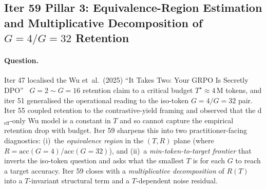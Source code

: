 \subsection{Iter 59 Pillar 3: Equivalence-Region Estimation and Multiplicative Decomposition of $G{=}4/G{=}32$ Retention}
\label{sec:group-size-iter59}

\paragraph{Question.}
Iter 47 localised the Wu et~al.\ (2025) ``It Takes Two: Your GRPO Is
Secretly DPO''~\citep{wu2025grpo_dpo} $G{=}2 \sim G{=}16$ retention
claim to a critical budget $T^\star \approx 4$\,M tokens, and iter 51
generalised the operational reading to the iso-token
$G{=}4/G{=}32$ pair.  Iter 55 coupled retention to the
contrastive-yield framing and observed that the d$_{\mathrm{eff}}$-only
Wu model is a constant in $T$ and so cannot capture the empirical
retention drop with budget.  Iter 59 sharpens this into two
practitioner-facing diagnostics: (i)~the \emph{equivalence region} in
the $(T, R)$ plane (where $R = \mathrm{acc}(G{=}4)/\mathrm{acc}(G{=}32)$),
and (ii)~a \emph{min-token-to-target frontier} that inverts the
iso-token question and asks what the smallest $T$ is for each
$G$ to reach a target accuracy.  Iter 59 closes with a
\emph{multiplicative decomposition} of $R(T)$ into a
$T$-invariant structural term and a $T$-dependent noise residual.

